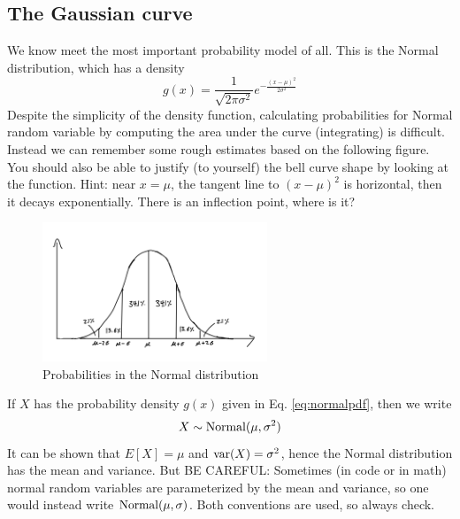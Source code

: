   \subsection{The Gaussian curve}
We know meet the most important probability model of all. This is the Normal distribution, which has a density 
   \begin{equation}\label{eq:normalpdf}
   g(x)= \frac{1}{\sqrt{2\pi \sigma^2}}e^{-\frac{(x-\mu)^2}{2 \sigma^2}}
   \end{equation}
 Despite the simplicity of the density function, calculating probabilities for Normal random variable by computing the area under the curve (integrating) is difficult. Instead we can remember some rough estimates based on the following figure. You should also be able to justify (to yourself) the bell curve shape by looking at the function. Hint: near $x = \mu$, the tangent line to $(x-\mu)^2$ is horizontal, then it decays exponentially. There is an inflection point, where is it? 

\begin{figure}[h]
\centering
\includegraphics[width=0.6\textwidth]{./../figures/bellcurve}
\caption{Probabilities in the Normal distribution}\label{fig:bellcurve}
\end{figure}

If $X$ has the probability density $g(x)$ given in Eq. \ref{eq:normalpdf}, then we write
\begin{equation}
X \sim {\rm Normal}(\mu, \sigma^2)
\end{equation}
It can be shown that $E[X] = \mu$ and ${\rm var}(X) = \sigma^2$, hence the Normal distribution has the mean and variance. But BE CAREFUL: Sometimes (in code or in math) normal random variables are parameterized by the mean and variance, so one would instead write ${\rm Normal}(\mu, \sigma)$. Both conventions are used, so always check. 





